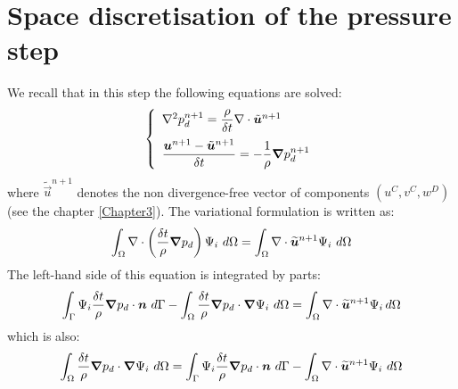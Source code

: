 \section{Space discretisation of the pressure step}

We recall that in this step the following equations are solved:
\begin{equation}
  \left\{\begin{array}{l}
    \Lap p_d^{n+1} = \dfrac{\rho}{\delta t}\Div \tilde{\vec{u}}^{n+1} \medskip \\
    \dfrac{\vec{u}^{n+1}-\tilde{\vec{u}}^{n+1}}{\delta t} = -\dfrac{1}{\rho}\Grad p_d^{n+1}
  \end{array}\right.\label{eq:pressurestepdiscrete}
\end{equation}
where $\tilde{\vec{u}}^{n+1}$ denotes the non divergence-free vector of components
$(u^C, v^C, w^D)$ (see the chapter \ref{Chapter3}).
The variational formulation is written as:%
\begin{equation}
\int_{\Omega}\nabla \cdot\left(\dfrac{\delta t}{\rho}\bm{\nabla} p_{d}\right)\Psi_{i}~d\Omega =
\int_{\Omega} \nabla \cdot\bm{\widetilde{u}}^{n+1}\Psi_{i}~d\Omega
\end{equation}
The left-hand side of this equation is integrated by parts:
\begin{equation}
\int_{\Gamma}\Psi_{i}\dfrac{\delta t}{\rho}\bm{\nabla} p_{d}\cdot \bm{n}~d\Gamma
-\int_{\Omega}\dfrac{\delta t}{\rho}\bm{\nabla} p_{d}\cdot\bm{\nabla} \Psi_{i}~d\Omega
=\int_{\Omega}\nabla \cdot\bm{\widetilde{u}}^{n+1}\Psi_{i}\,d\Omega
\end{equation}
which is also:%
\begin{equation}
\int_{\Omega}\dfrac{\delta t}{\rho}\Grad p_{d}\cdot \Grad\Psi_{i}~d\Omega =
\int_{\Gamma}\Psi_{i}\dfrac{\delta t}{\rho}\Grad p_{d} \cdot \vec{n}~d\Gamma
-\int_{\Omega}\Div\vec{\widetilde{u}}^{n+1}\Psi_{i}~d\Omega\label{basic}%
\end{equation}



